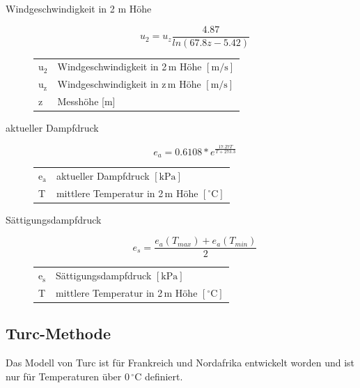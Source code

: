 \begin{description}
\item[Windgeschwindigkeit in 2 m Höhe]
\begin{equation}
\label{eq:u2}
u_2=u_z\frac{4.87}{ln(67.8z-5.42)}
\end{equation}
\begin{table}[H]
\centering
\begin{tabular}{ll}
$\mathrm{u_2}$ & Windgeschwindigkeit in 2\,m Höhe $\mathrm{[m/s]}$\\
$\mathrm{u_z}$ & Windgeschwindigkeit in z\,m Höhe $\mathrm{[m/s]}$\\
z & Messhöhe [m]\\
\end{tabular}
\end{table}

\item[aktueller Dampfdruck]
\begin{equation}
\label{eq:ea}
e_a=0.6108*e^{\frac{17.27T}{T+273.3}}
\end{equation}
\begin{table}[H]
\centering
\begin{tabular}{ll}
$\mathrm{e_a}$ & aktueller Dampfdruck $\mathrm{[kPa]}$\\
T & mittlere Temperatur in 2\,m Höhe $\mathrm{[^{\circ}C]}$\\\end{tabular}
\end{table}

\item[Sättigungsdampfdruck]
\begin{equation}
\label{eq:es}
e_s=\frac{e_a(T_{max})+e_a(T_{min})}{2}
\end{equation}
\begin{table}[H]
\centering
\begin{tabular}{ll}
$\mathrm{e_s}$ & Sättigungsdampfdruck $\mathrm{[kPa]}$\\
T & mittlere Temperatur in 2\,m Höhe $\mathrm{[^{\circ}C]}$\\
\end{tabular}
\end{table}


\end{description}

\subsection{Turc-Methode}
Das Modell von Turc ist für Frankreich und Nordafrika entwickelt worden und ist nur für Temperaturen über 0\,$\mathrm{^{\circ}C}$ definiert.

